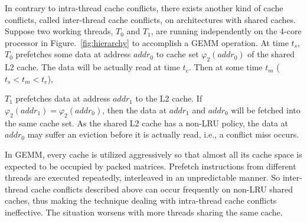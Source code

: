 In contrary to intra-thread cache conflicts,
there exists another kind of cache conflicts, called
inter-thread cache conflicts, on architectures with shared caches.
Suppose two working threads, $T_0$ and $T_1$, are running independently
on the 4-core processor in Figure.~\ref{fig:hierarchy}
to accomplish a GEMM operation.
At time $t_s$, $T_0$ prefetches some data at address $addr_0$
to cache set $\varphi_2(addr_0)$ of the shared L2 cache.
The data will be actually read at time $t_e$.
Then at some time $t_m$ ($t_s < t_m < t_e$),

$T_1$ prefetches data at address $addr_1$ to the L2 cache.
If $\varphi_2(addr_1)=\varphi_2(addr_0)$, then the
data at $addr_1$ and $addr_0$ will be fetched into the same cache set.
As the shared L2 cache has a non-LRU policy,
the data at $addr_0$ may suffer an eviction before it is actually read,
i.e., a conflict miss occurs.

In GEMM, every cache is utilized aggressively
so that almost all its cache space is expected to be occupied by packed matrices.
Prefetch instructions from different threads are executed repeatedly,
interleaved in an unpredictable manner.
So inter-thread cache conflicts described above
can occur frequently on non-LRU shared caches,
thus making the technique dealing with intra-thread cache conflicts ineffective.
The situation worsens with more threads sharing the same cache.

